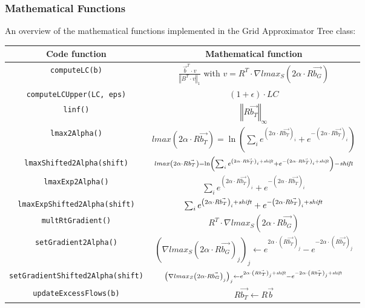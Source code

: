 \subsubsection{Mathematical Functions}
An overview of the mathematical functions implemented in the Grid Approximator Tree class:\\
\begin{tabular}{c|c}
Code function&Mathematical function\\
\hline
\texttt{computeLC(b)}&$\frac{\vec{b}^T\cdot v}{\left\Vert B^T\cdot v\right\Vert_1}$ with $v=R^T\cdot \nabla lmax_S\left(2\alpha\cdot R\vec{b_G}\right)$\\
\hline
\texttt{computeLCUpper(LC, eps)}&$(1+\epsilon)\cdot LC$\\
\hline
\texttt{linf()}&$\left\Vert R\vec{b_T}\right\Vert_\infty$\\
\hline
\texttt{lmax2Alpha()}&$lmax\left(2\alpha\cdot R\vec{b_T}\right)=\ln\left(\sum_ie^{\left(2\alpha\cdot R\vec{b_T}\right)_i}+e^{-\left(2\alpha\cdot R\vec{b_T}\right)_i}\right)$\\
\hline
\texttt{lmaxShifted2Alpha(shift)}&$\mathsmaller{lmax\left(2\alpha\cdot R\vec{b_T}\right)=\ln\left(\sum_ie^{\left(2\alpha\cdot R\vec{b_T}\right)_i+\text{\emph{shift}}}+e^{-\left(2\alpha\cdot R\vec{b_T}\right)_i+\text{\emph{shift}}}\right)-\text{\emph{shift}}}$\\
\hline
\texttt{lmaxExp2Alpha()}&$\sum_ie^{\left(2\alpha\cdot R\vec{b_T}\right)_i}+e^{-\left(2\alpha\cdot R\vec{b_T}\right)_i}$\\
\hline
\texttt{\footnotesize lmaxExpShifted2Alpha(shift)}&$\sum_ie^{\left(2\alpha\cdot R\vec{b_T}\right)_i+\text{\emph{shift}}}+e^{-\left(2\alpha\cdot R\vec{b_T}\right)_i+\text{\emph{shift}}}$\\
\hline
\texttt{multRtGradient()}&$R^T\cdot \nabla lmax_S\left(2\alpha\cdot R\vec{b_G}\right)$\\
\hline
\texttt{setGradient2Alpha()}&$\left(\nabla lmax_S\left(2\alpha\cdot R\vec{b_G}\right)_j\right)_j\gets e^{2\alpha\cdot \left(R\vec{b_T}\right)_j}-e^{-2\alpha\cdot \left(R\vec{b_T}\right)_j}$\\
\hline
\texttt{\footnotesize setGradientShifted2Alpha(shift)}&$\mathsmaller{\left(\nabla lmax_S\left(2\alpha\cdot R\vec{b_G}\right)_j\right)_j\gets e^{2\alpha\cdot \left(R\vec{b_T}\right)_j+\emph{shift}}-e^{-2\alpha\cdot \left(R\vec{b_T}\right)_j+\emph{shift}}}$\\
\hline
\texttt{updateExcessFlows(b)}&$R\vec{b_T}\gets R\vec{b}$\\
\hline
\end{tabular}\\

